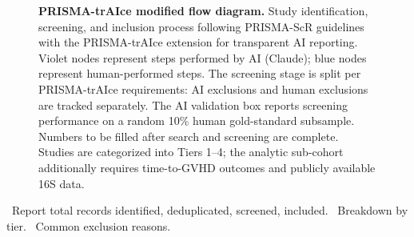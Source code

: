 \documentclass[11pt,a4paper]{article}
\newcommand{\todoitem}[1]{\textcolor{blue!70!black}{\textbullet~#1}}
\begin{document}
\begin{figure}[htbp]
{\begin{tikzpicture}
\end{tikzpicture}
}%
\caption{\textbf{PRISMA-trAIce modified flow diagram.}
Study identification, screening, and inclusion process following PRISMA-ScR guidelines with the PRISMA-trAIce extension for transparent AI reporting.
Violet nodes represent steps performed by AI (Claude); blue nodes represent human-performed steps.
The screening stage is split per PRISMA-trAIce requirements: AI exclusions and human exclusions are tracked separately.
The AI validation box reports screening performance on a random 10\% human gold-standard subsample.
Numbers to be filled after search and screening are complete.
Studies are categorized into Tiers 1--4; the analytic sub-cohort additionally requires time-to-GVHD outcomes and publicly available 16S data.}
\label{fig:prisma}
\end{figure}


\todoitem{Report total records identified, deduplicated, screened, included.}
\todoitem{Breakdown by tier.}
\todoitem{Common exclusion reasons.}
\end{document}
